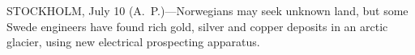 
STOCKHOLM, July 10 (A.~P.)---Norwegians may seek unknown land, but
some Swede engineers have found rich gold, silver and copper deposits
in an arctic glacier, using new electrical prospecting apparatus.
